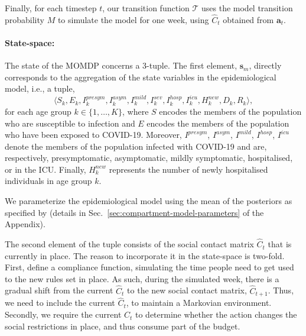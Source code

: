 \documentclass{article}
\newcommand{\mdptransition}{\mathcal{T}}
\newcommand{\mdpstate}{\mathbf{s}}
\newcommand{\mdpaction}{\mathbf{a}}
\newcommand{\momdpname}{MOBelCov}
\newcommand{\agegroups}{K}
\newcommand{\ltuple}{\langle}
\newcommand{\rtuple}{\rangle}
\begin{document}
Finally, for each timestep $t$, our transition function $\mdptransition$ uses the model transition probability $M$ to simulate the model for one week, using $\hat{C}_t$ obtained from $\mdpaction_t$.


\paragraph{State-space:} The state of the MOMDP concerns a 3-tuple. The first element, $\mdpstate_m$, directly corresponds to the aggregation of the state variables in the epidemiological model, i.e., a tuple,
\begin{equation}
    \ltuple S_k, E_k, I_k^{presym}, I_k^{asym}, I_k^{mild}, I_k^{sev}, I_k^{hosp}, I_k^{icu}, H^{new}_k, D_k, R_k \rtuple ,
\end{equation}
%
for each age group $k \in \{1, \ldots, \agegroups\}$, where $S$ encodes the members of the population who are susceptible to infection and $E$ encodes the members of the population who have been exposed to COVID-19. Moreover, $I^{presym}$, $I^{asym}$, $I^{mild}$, $I^{hosp}$, $I^{icu}$ denote the members of the population infected with COVID-19 and are, respectively, presymptomatic, asymptomatic, mildly symptomatic, hospitalised, or in the ICU. Finally, $H^{new}_k$ represents the number of newly hospitalised individuals in age group $k$.

We parameterize the epidemiological model using the mean of the posteriors as specified by \citet{abrams2021modelling} (details in Sec.~\ref{sec:compartment-model-parameters} of the Appendix).

The second element of the tuple consists of the social contact matrix $\hat{C}_t$ that is currently in place. The reason to incorporate it in the state-space is two-fold. First, \citet{abrams2021modelling} define a compliance function, simulating the time people need to get used to the new rules set in place. As such, during the simulated week, there is a gradual shift from the current $\hat{C}_t$ to the new social contact matrix, $\hat{C}_{t+1}$. Thus, we need to include the current $\hat{C}_t$, to maintain a Markovian environment. Secondly, we require the current $\hat{C}_t$ to determine whether the action changes the social restrictions in place, and thus consume part of the budget.
\end{document}
